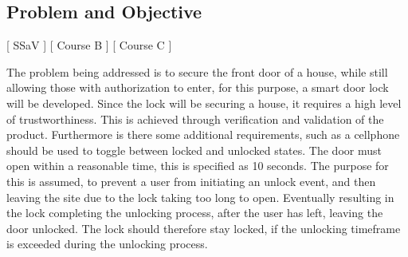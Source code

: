 \subsection{Problem and Objective}\label{sec:ProblemAndObjective}
[ SSaV ] [ Course B ] [ Course C ] 
\newline
[ Casper ] [ Author B ] [ Author C ] 
\newline






The problem being addressed is to secure the front door of a house, while still allowing those with authorization to enter, for this purpose, a smart door lock will be developed.
Since the lock will be securing a house, it requires a high level of trustworthiness.
This is achieved through verification and validation of the product.
Furthermore is there some additional requirements, such as a cellphone should be used to toggle between locked and unlocked states.
The door must open within a reasonable time, this is specified as 10 seconds.
The purpose for this is assumed, to prevent a user from initiating an unlock event, and then leaving the site due to the lock taking too long to open.
Eventually resulting in the lock completing the unlocking process, after the user has left, leaving the door unlocked.
The lock should therefore stay locked, if the unlocking timeframe is exceeded during the unlocking process.